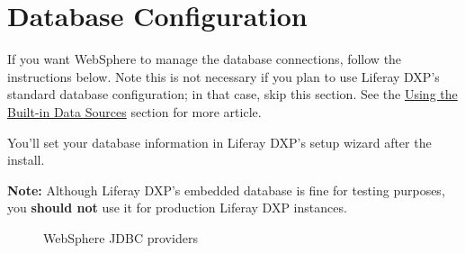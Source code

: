 \section{Database Configuration}\label{database-configuration-4}

If you want WebSphere to manage the database connections, follow the
instructions below. Note this is not necessary if you plan to use
Liferay DXP's standard database configuration; in that case, skip this
section. See the
\href{/docs/7-2/deploy/-/knowledge_base/d/preparing-for-install\#using-the-built-in-data-source}{Using
the Built-in Data Sources} section for more article.

You'll set your database information in Liferay DXP's setup wizard after
the install.

\noindent\hrulefill

\textbf{Note:} Although Liferay DXP's embedded database is fine for
testing purposes, you \textbf{should not} use it for production Liferay
DXP instances.

\noindent\hrulefill

\begin{figure}
\centering
{}
\caption{WebSphere JDBC providers}
\end{figure}

